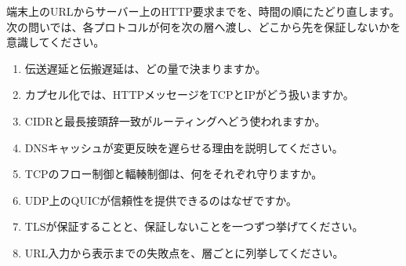 端末上のURLからサーバー上のHTTP要求までを、時間の順にたどり直します。次の問いでは、各プロトコルが何を次の層へ渡し、どこから先を保証しないかを意識してください。

\begingroup
  \begin{enumerate}
    \item 伝送遅延と伝搬遅延は、どの量で決まりますか。
    \item カプセル化では、HTTPメッセージをTCPとIPがどう扱いますか。
    \item CIDRと最長接頭辞一致がルーティングへどう使われますか。
    \item DNSキャッシュが変更反映を遅らせる理由を説明してください。
    \item TCPのフロー制御と輻輳制御は、何をそれぞれ守りますか。
    \item UDP上のQUICが信頼性を提供できるのはなぜですか。
    \item TLSが保証することと、保証しないことを一つずつ挙げてください。
    \item URL入力から表示までの失敗点を、層ごとに列挙してください。
  \end{enumerate}
\par
\endgroup
